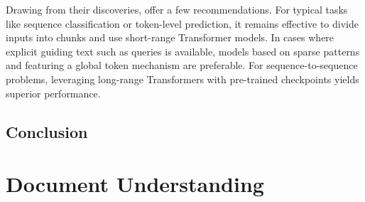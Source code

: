Drawing from their discoveries, \citet{qin2022nlp} offer a few recommendations. For typical tasks like sequence classification or token-level prediction, it remains effective to divide inputs into chunks and use short-range Transformer models. In cases where explicit guiding text such as queries is available, models based on sparse patterns and featuring a global token mechanism are preferable. For sequence-to-sequence problems, leveraging long-range Transformers with pre-trained checkpoints yields superior performance.

\subsection{Conclusion}


\section{Document Understanding}


